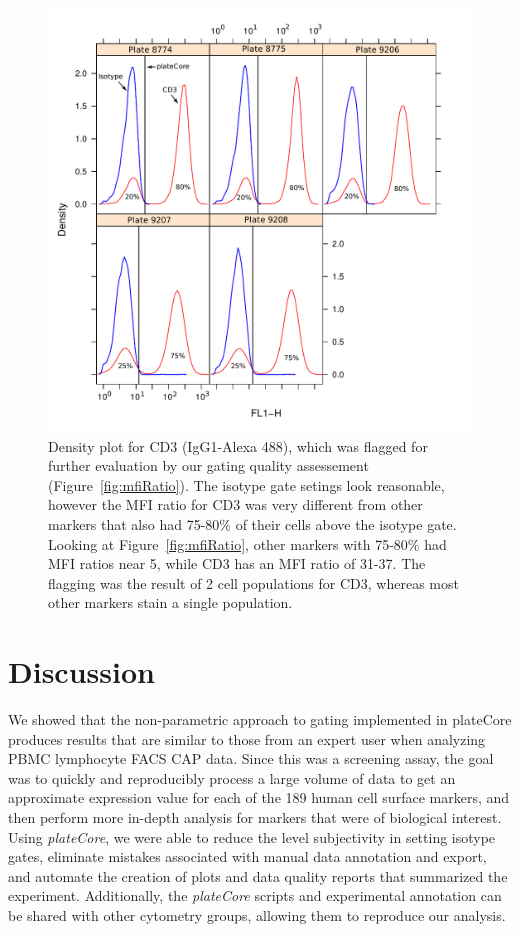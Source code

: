 \documentclass[12pt]{article}
\newcommand{\Rpackage}[1]{{\textit{#1}}}
\begin{document}
\begin{figure}
\centering
\includegraphics{mfiRatio2.pdf}
\caption{Density plot for CD3 (IgG1-Alexa 488), which was flagged for further
evaluation by our gating quality assessement (Figure~\ref{fig:mfiRatio}).
The isotype gate setings look reasonable, however the MFI ratio for CD3 was
very different from other markers that also had 75-80\% of their cells above
the isotype gate. Looking at Figure~\ref{fig:mfiRatio}, other markers with
75-80\% had MFI ratios near 5, while CD3 has an MFI ratio of 31-37. The
flagging was the result of 2 cell populations for CD3, whereas most other
markers stain a single population. }
\label{fig:mfiRatio3}
\end{figure}

\clearpage
\section*{Discussion}

We showed that the non-parametric approach to gating implemented in plateCore
produces results that are similar to those from an expert user when analyzing
PBMC lymphocyte FACS CAP data. Since this was a screening assay, the goal was to
quickly and reproducibly process a large volume of data to get an approximate
expression value for each of the 189 human cell surface markers, and then
perform more in-depth analysis for markers that were of biological interest.
Using \Rpackage{plateCore}, we were able to reduce the level subjectivity in
setting isotype gates, eliminate mistakes associated with manual data
annotation and export, and automate the creation of plots and data quality
reports that summarized the experiment. Additionally, the \Rpackage{plateCore}
scripts and experimental annotation can be shared with other cytometry groups,
allowing them to reproduce our analysis.
\end{document}
